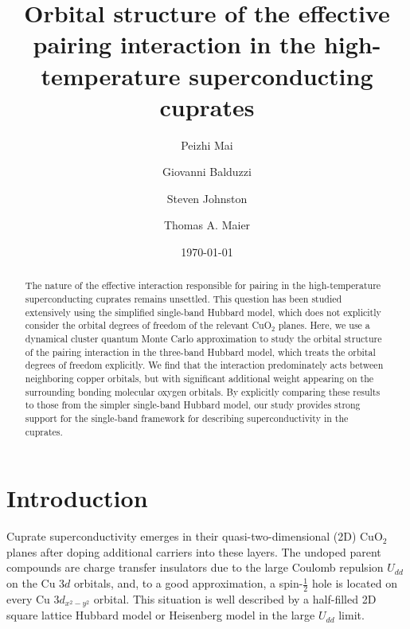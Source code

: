 \documentclass[fleqn,twocolumn,11pt]{wlscirep}
\begin{document}
\title{Orbital structure of the effective pairing interaction in the high-temperature superconducting cuprates}

\author[1]{Peizhi Mai}
\author[2]{Giovanni Balduzzi}
\author[3,4]{Steven Johnston}
\author[1,5,*]{Thomas A. Maier}

\date{\today}

\begin{abstract}
The nature of the effective interaction responsible for pairing in the high-temperature superconducting cuprates remains unsettled. This question has been studied extensively using the simplified single-band Hubbard model, which does not explicitly consider the orbital degrees of freedom of the relevant CuO$_2$ planes. Here, we use a dynamical cluster quantum Monte Carlo approximation to study the orbital structure of the pairing interaction in the three-band Hubbard model, which treats the orbital degrees of freedom explicitly. We find that the interaction predominately acts between neighboring copper orbitals, but with significant additional weight appearing on the surrounding bonding molecular oxygen orbitals. By explicitly comparing these results to those from the simpler single-band Hubbard model, our study provides strong support for the single-band framework for describing superconductivity in the cuprates.
\end{abstract}

\maketitle


\section*{Introduction}
Cuprate superconductivity emerges in their quasi-two-dimensional (2D) CuO$_2$ planes after doping additional carriers into these layers. The undoped parent compounds are charge transfer insulators due to the large Coulomb repulsion $U_{dd}$ on the Cu 3$d$ orbitals, and, to a good approximation, a spin-$\tfrac{1}{2}$ hole is located on every Cu 3$d_{x^2-y^2}$ orbital. This situation is well described by a half-filled 2D square lattice Hubbard model or Heisenberg model in the large $U_{dd}$ limit. 
\end{document}
